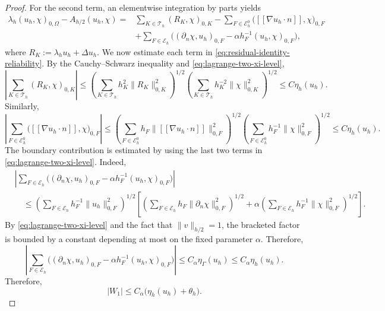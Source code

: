 \documentclass[onefignum,onetabnum,final]{siamart250211}
\numberwithin{equation}{section}
\newcommand\0{\boldsymbol{0}}
\begin{document}
\begin{proof}
For the second term, an elementwise integration by parts yields
\begin{align}
\lambda_h(u_h,\chi)_{0,\Omega}-A_{h/2}(u_h,\chi) =& \sum_{K\in\mathcal T_h}(R_K,\chi)_{0,K} -\sum_{F\in\mathcal E_h^0} \big([\![\nabla u_h\cdot n]\!],\chi\big)_{0,F} \nonumber\\
&+ \sum_{F\in\mathcal E_h} \Big( (\partial_n\chi,u_h)_{0,F} -\alpha h_F^{-1}(u_h,\chi)_{0,F} \Big),
\label{eq:residual-identity-reliability}
\end{align}
where $R_K:=\lambda_hu_h+\Delta u_h$. We now estimate each term in \eqref{eq:residual-identity-reliability}. By the Cauchy--Schwarz inequality and \eqref{eq:lagrange-two-xi-level},
\[
\left|\sum_{K\in\mathcal T_h}(R_K,\chi)_{0,K}\right| \leq \left( \sum_{K\in\mathcal T_h}h_K^2\|R_K\|_{0,K}^2 \right)^{1/2} \left(
\sum_{K\in\mathcal T_h}h_K^{-2}\|\chi\|_{0,K}^2 \right)^{1/2} \leq C\eta_h(u_h).\]
Similarly,
\[
\left| \sum_{F\in\mathcal E_h^0} \big([\![\nabla u_h\cdot n]\!],\chi\big)_{0,F} \right| \leq \left(\sum_{F\in\mathcal E_h^0}h_F
\|[\![\nabla u_h\cdot n]\!]\|_{0,F}^2 \right)^{1/2} \left( \sum_{F\in\mathcal E_h^0}h_F^{-1}\|\chi\|_{0,F}^2 \right)^{1/2} \leq C\eta_h(u_h).
\]
The boundary contribution is estimated by using the last two terms in
\eqref{eq:lagrange-two-xi-level}. Indeed,
\[
\begin{aligned}
&\left|\sum_{F\in\mathcal E_h} \Big( (\partial_n\chi,u_h)_{0,F} -\alpha h_F^{-1}(u_h,\chi)_{0,F} \Big) \right|\\
&\quad \le\left(\sum_{F\in\mathcal E_h}h_F^{-1}\|u_h\|_{0,F}^2\right)^{1/2}\left[\left(\sum_{F\in\mathcal E_h}h_F\|\partial_n\chi\|_{0,F}^2 \right)^{1/2} + \alpha \left( \sum_{F\in\mathcal E_h} h_F^{-1}\|\chi\|_{0,F}^2 \right)^{1/2} \right].
\end{aligned}
\]
By \eqref{eq:lagrange-two-xi-level} and the fact that
\(\|v\|_{h/2}=1\), the bracketed factor is bounded by a constant depending at most
on the fixed parameter \(\alpha\). Therefore,
\[
\left| \sum_{F\in\mathcal E_h} \Big( (\partial_n\chi,u_h)_{0,F} -\alpha h_F^{-1}(u_h,\chi)_{0,F} \Big) \right|\le C_\alpha \eta_\Gamma(u_h) \le C_\alpha \eta_h(u_h).
\]
Therefore,
\[
   |W_1| \leq C_\alpha\big(\eta_h(u_h)+\theta_h\big).
\]


\end{proof}
\end{document}
